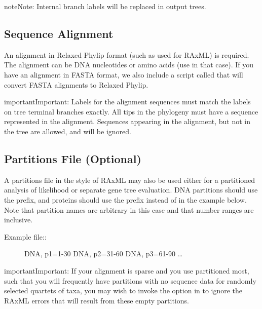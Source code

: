 \documentclass[letterpaper,12pt,english]{sphinxmanual}
\begin{document}
\begin{sphinxadmonition}{note}{Note:}
Internal branch labels will be replaced in output trees.
\end{sphinxadmonition}


\subsection{Sequence Alignment}
\label{\detokenize{intro:sequence-alignment}}
An alignment in Relaxed Phylip format (such as used for RAxML) is required.  The alignment can be DNA nucleotides or amino acids (use  in that case). If you have an alignment in FASTA format, we also include a script called  that will convert FASTA alignments to Relaxed Phylip.

\begin{sphinxadmonition}{important}{Important:}
Labels for the alignment sequences must match the labels on tree terminal branches exactly. All tips in the phylogeny must have a sequence represented in the alignment.  Sequences appearing in the alignment, but not in the tree are allowed, and will be ignored.
\end{sphinxadmonition}


\subsection{Partitions File (Optional)}
\label{\detokenize{intro:partitions-file-optional}}
A partitions file in the style of RAxML may also be used either for a partitioned analysis of likelihood or separate gene tree evaluation.  DNA partitions should use the  prefix, and proteins should use the  prefix instead of  in the example below.  Note that partition names are arbitrary in this case and that number ranges are inclusive.
\begin{description}
\item[{Example file::}] \leavevmode
DNA, p1=1-30
DNA, p2=31-60
DNA, p3=61-90
…

\end{description}

\begin{sphinxadmonition}{important}{Important:}
If your alignment is sparse and you use partitioned most, such that you will frequently have partitions with no sequence data for randomly selected quartets of taxa, you may wish to invoke the  option in  to ignore the RAxML errors that will result from these empty partitions.
\end{sphinxadmonition}
\end{document}
